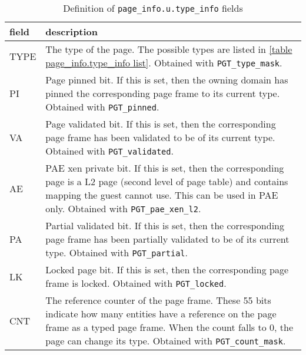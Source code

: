 \begin{table}
  \centering
  \begin{tabularx}{\textwidth}{ | l | X | }
    \hline
    field   & description \\
    \hline
    TYPE    & The type of the page. The possible types are listed in
              \ref{table page_info.type_info list}.
              Obtained with \texttt{PGT\_type\_mask}. \\
    \hline
    PI      & Page pinned bit. If this is set, then the owning domain has
              pinned the corresponding page frame to its current type.
              Obtained with \texttt{PGT\_pinned}. \\
    \hline
    VA      & Page validated bit. If this is set, then the corresponding
              page frame has been validated to be of its current type.
              Obtained with \texttt{PGT\_validated}. \\
    \hline
    AE      & PAE xen private bit. If this is set, then the corresponding
              page is a L2 page (second level of page table) and contains
              mapping the guest cannot use. This can be used in PAE only.
              Obtained with \texttt{PGT\_pae\_xen\_l2}. \\
    \hline
    PA      & Partial validated bit. If this is set, then the corresponding
              page frame has been partially validated to be of its current
              type. Obtained with \texttt{PGT\_partial}. \\
    \hline
    LK      & Locked page bit. If this is set, then the corresponding page
              frame is locked. Obtained with \texttt{PGT\_locked}. \\
    \hline
    CNT     & The reference counter of the page frame. These 55 bits indicate
              how many entities have a reference on the page frame as a typed
              page frame. When the count falls to 0, the page can change its
              type. Obtained with \texttt{PGT\_count\_mask}. \\
    \hline
  \end{tabularx}
  \caption{\label{table page_info.type_info}Definition of
    \texttt{page\_info.u.type\_info} fields}
\end{table}

